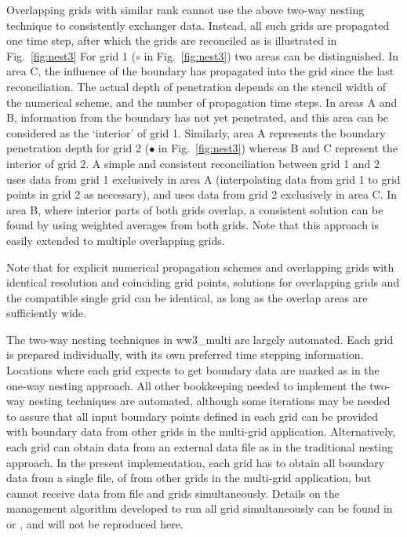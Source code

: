 Overlapping grids with similar rank cannot use the above two-way nesting
technique to consistently exchanger data. Instead, all such grids are
propagated one time step, after which the grids are reconciled as is
illustrated in Fig.~\ref{fig:nest3} For grid 1 ($\circ$ in
Fig.~\ref{fig:nest3}) two areas can be distinguished. In area C, the influence
of the boundary has propagated into the grid since the last
reconciliation. The actual depth of penetration depends on the stencil width
of the numerical scheme, and the number of propagation time steps.  In areas A
and B, information from the boundary has not yet penetrated, and this area can
be considered as the `interior' of grid 1.  Similarly, area A represents the
boundary penetration depth for grid 2 ($\bullet$ in Fig.~\ref{fig:nest3})
whereas B and C represent the interior of grid 2.  A simple and consistent
reconciliation between grid 1 and 2 uses data from grid 1 exclusively in area
A (interpolating data from grid 1 to grid points in grid 2 as necessary), and
uses data from grid 2 exclusively in area C. In area B, where interior parts
of both grids overlap, a consistent solution can be found by using weighted
averages from both grids. Note that this approach is easily extended to
multiple overlapping grids.

Note that for explicit numerical propagation schemes and overlapping grids with
identical resolution and coinciding grid points, solutions for overlapping
grids and the compatible single grid can be identical, as long as the overlap
areas are sufficiently wide.



\vspace{\baselineskip} 
\noindent 
The two-way nesting techniques in {\file ww3\_multi} are largely automated.
Each grid is prepared individually, with its own preferred time stepping
information. Locations where each grid expects to get boundary data are marked
as in the one-way nesting approach. All other bookkeeping needed to implement
the two-way nesting techniques are automated, although some iterations may be
needed to assure that all input boundary points defined in each grid can be
provided with boundary data from other grids in the multi-grid application.
Alternatively, each grid can obtain data from an external data file as in the
traditional nesting approach. In the present implementation, each grid has to
obtain all boundary data from a single file, of from other grids in the
multi-grid application, but cannot receive data from file and grids
simultaneously. Details on the management algorithm developed to run all grid
simultaneously can be found in \citet[section 3.4]{tol:MMAB07b} or
\cite{tol:OMOD08b}, and will not be reproduced here.

